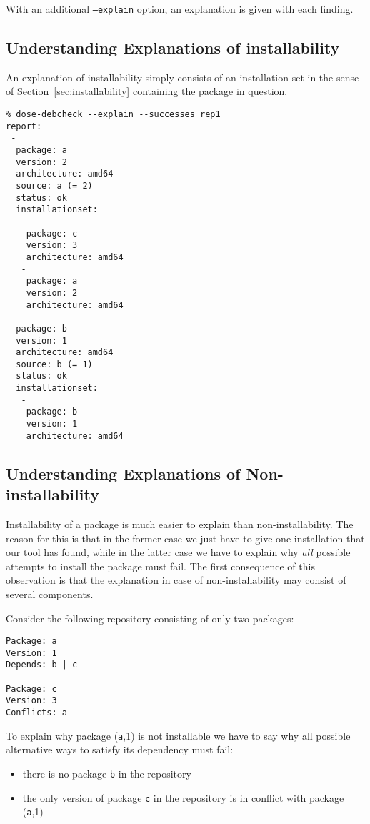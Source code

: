 With an additional \texttt{--explain} option, an explanation is given
with each finding. 

\subsection{Understanding Explanations of installability}

An explanation of installability simply consists of an
installation set in the sense of Section~\ref{sec:installability}
containing the package in question.

\begin{example}
\begin{verbatim}
% dose-debcheck --explain --successes rep1
report:
 -
  package: a
  version: 2
  architecture: amd64
  source: a (= 2)
  status: ok
  installationset:
   -
    package: c
    version: 3
    architecture: amd64
   -
    package: a
    version: 2
    architecture: amd64
 -
  package: b
  version: 1
  architecture: amd64
  source: b (= 1)
  status: ok
  installationset:
   -
    package: b
    version: 1
    architecture: amd64
\end{verbatim}
\end{example}

\subsection{Understanding Explanations of Non-installability}

Installability of a package is much easier to explain than
non-installability. The reason for this is that in the former case we
just have to give one installation that our tool has found, while in
the latter case we have to explain why \emph{all} possible attempts to
install the package must fail. The first consequence of this
observation is that the explanation in case of non-installability may
consist of several components.

\begin{example}
  Consider the following repository consisting of only two packages:
\begin{verbatim}
Package: a
Version: 1
Depends: b | c

Package: c
Version: 3
Conflicts: a
\end{verbatim}
To explain why package (\texttt{a},1) is not installable we have to
say why all possible alternative ways to satisfy its dependency must
fail:
\begin{itemize}
\item there is no package \texttt{b} in the repository
\item the only version of package \texttt{c} in the repository is in
  conflict with package (\texttt{a},1)
\end{itemize}
\end{example}

